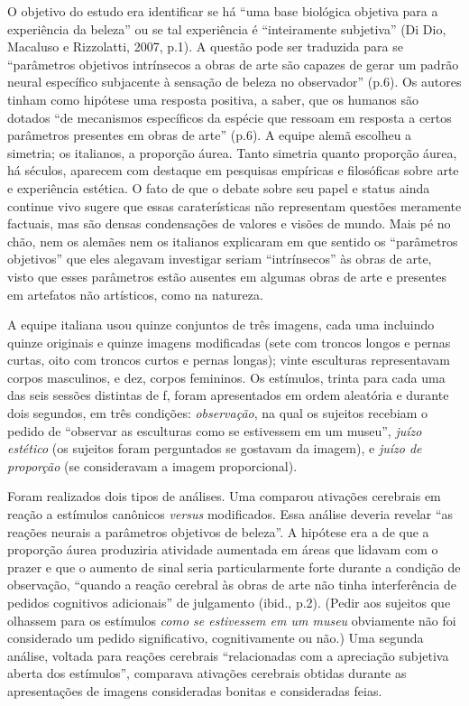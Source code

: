 O objetivo do estudo era identificar se há ``uma base biológica objetiva
para a experiência da beleza'' ou se tal experiência é ``inteiramente
subjetiva'' (Di Dio, Macaluso e Rizzolatti, 2007, p.1). A questão pode
ser traduzida para se ``parâmetros objetivos intrínsecos a obras de arte
são capazes de gerar um padrão neural específico subjacente à sensação
de beleza no observador'' (p.6). Os autores tinham como hipótese uma
resposta positiva, a saber, que os humanos são dotados ``de mecanismos
específicos da espécie que ressoam em resposta a certos parâmetros
presentes em obras de arte'' (p.6). A equipe alemã escolheu a simetria;
os italianos, a proporção áurea. Tanto simetria quanto proporção áurea,
há séculos, aparecem com destaque em pesquisas empíricas e filosóficas
sobre arte e experiência estética. O fato de que o debate sobre seu
papel e status ainda continue vivo sugere que essas caraterísticas não
representam questões meramente factuais, mas são densas condensações de
valores e visões de mundo. Mais pé no chão, nem os alemães nem os
italianos explicaram em que sentido os ``parâmetros objetivos'' que eles
alegavam investigar seriam ``intrínsecos'' às obras de arte, visto que
esses parâmetros estão ausentes em algumas obras de arte e presentes em
artefatos não artísticos, como na natureza.

A equipe italiana usou quinze conjuntos de três imagens, cada uma
incluindo quinze originais e quinze imagens modificadas (sete com
troncos longos e pernas curtas, oito com troncos curtos e pernas
longas); vinte esculturas representavam corpos masculinos, e dez, corpos
femininos. Os estímulos, trinta para cada uma das seis sessões distintas
de f, foram apresentados em ordem aleatória e durante dois segundos,
em três condições: \emph{observação}, na qual os sujeitos recebiam o
pedido de ``observar as esculturas como se estivessem em um museu'',
\emph{juízo estético} (os sujeitos foram perguntados se gostavam da
imagem), e \emph{juízo de proporção} (se consideravam a imagem
proporcional).

Foram realizados dois tipos de análises. Uma comparou ativações
cerebrais em reação a estímulos canônicos \emph{versus} modificados.
Essa análise deveria revelar ``as reações neurais a parâmetros objetivos
de beleza''. A hipótese era a de que a proporção áurea produziria
atividade aumentada em áreas que lidavam com o prazer e que o aumento de
sinal seria particularmente forte durante a condição de observação,
``quando a reação cerebral às obras de arte não tinha interferência de
pedidos cognitivos adicionais'' de julgamento (ibid., p.2). (Pedir aos
sujeitos que olhassem para os estímulos \emph{como se estivessem em um
museu} obviamente não foi considerado um pedido significativo,
cognitivamente ou não.) Uma segunda análise, voltada para reações
cerebrais ``relacionadas com a apreciação subjetiva aberta dos
estímulos'', comparava ativações cerebrais obtidas durante as
apresentações de imagens consideradas bonitas e consideradas feias.

